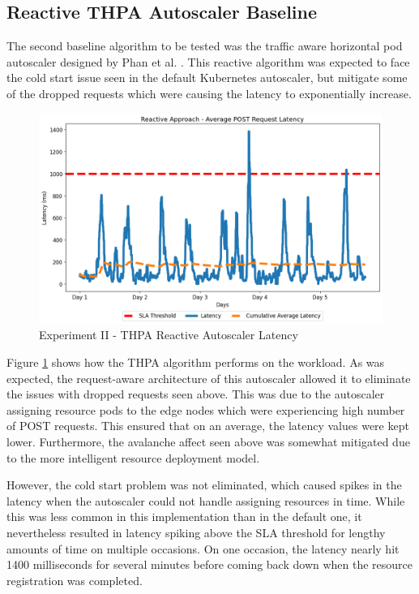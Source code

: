 \subsection {Reactive THPA Autoscaler Baseline}
\label{subsec:ch5-exp2-reactive-algo}

The second baseline algorithm to be tested was the traffic aware horizontal pod autoscaler designed by Phan et al. \cite{phan2022traffic}. This reactive algorithm was expected to face the cold start issue seen in the default Kubernetes autoscaler, but mitigate some of the dropped requests which were causing the latency to exponentially increase.\par

\begin{figure}[htb]
    \centering
    \caption{Experiment II - THPA Reactive Autoscaler Latency}
    \label{fig:exp2-reactive-k8s}
    \includegraphics[width=0.6\linewidth]{Figures/Compose-Post-Reactive-Latency.png}
\end{figure}

Figure \ref{fig:exp2-reactive-k8s} shows how the THPA algorithm performs on the workload. As was expected, the request-aware architecture of this autoscaler allowed it to eliminate the issues with dropped requests seen above. This was due to the autoscaler assigning resource pods to the edge nodes which were experiencing high number of POST requests. This ensured that on an average, the latency values were kept lower. Furthermore, the avalanche affect seen above was somewhat mitigated due to the more intelligent resource deployment model.\par

However, the cold start problem was not eliminated, which caused spikes in the latency when the autoscaler could not handle assigning resources in time. While this was less common in this implementation than in the default one, it nevertheless resulted in latency spiking above the SLA threshold for lengthy amounts of time on multiple occasions. On one occasion, the latency nearly hit 1400 milliseconds for several minutes before coming back down when the resource registration was completed.\par

